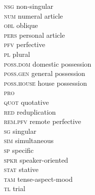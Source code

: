\documentclass[output=paper
,modfonts
,nonflat]{langsci/langscibook}
\begin{document}
\begin{multicols}{2}
\begin{tabbing}
		\textsc{nsg} \> non-singular\\
		\textsc{num} \> numeral article\\
		\textsc{obl} \> oblique\\
		\textsc{pers} \> personal article\\
		\textsc{pfv} \> perfective\\
		\textsc{pl} \> plural\\
		\textsc{poss.dom} \> domestic possession\\
		\textsc{poss.gen} \> general possession\\
		\textsc{poss.house} \> house possession\\
		\textsc{pro} \> \\
		\textsc{quot} \> quotative\\
		\textsc{red} \> reduplication\\
		\textsc{rem.pfv} \> remote perfective\\
		\textsc{sg} \> singular\\
		\textsc{sim} \> simultaneous\\
		\textsc{sp} \> specific\\
		\textsc{spkr} \> speaker-oriented\\
		\textsc{stat} \> stative\\
		\textsc{tam} \> tense-aspect-mood\\
		\textsc{tl} \> trial
	\end{tabbing}
\end{multicols}

\printbibliography[heading=subbibliography,notkeyword=this]
\end{document}
